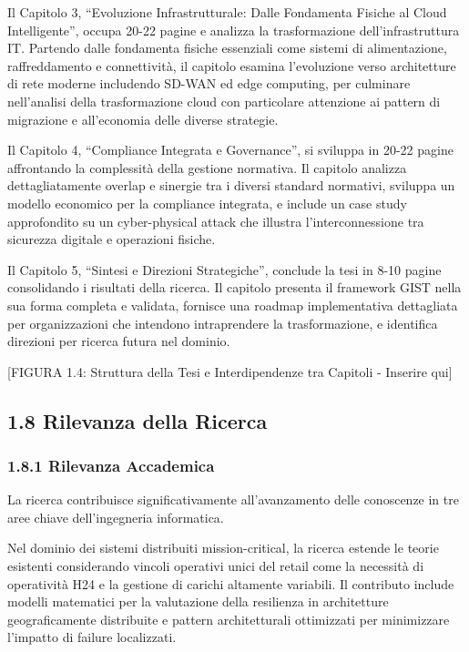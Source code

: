\documentclass{report}
\begin{document}
Il Capitolo 3, ``Evoluzione Infrastrutturale: Dalle Fondamenta Fisiche
al Cloud Intelligente'', occupa 20-22 pagine e analizza la
trasformazione dell'infrastruttura IT. Partendo dalle fondamenta fisiche
essenziali come sistemi di alimentazione, raffreddamento e connettività,
il capitolo esamina l'evoluzione verso architetture di rete moderne
includendo SD-WAN ed edge computing, per culminare nell'analisi della
trasformazione cloud con particolare attenzione ai pattern di migrazione
e all'economia delle diverse strategie.

Il Capitolo 4, ``Compliance Integrata e Governance'', si sviluppa in
20-22 pagine affrontando la complessità della gestione normativa. Il
capitolo analizza dettagliatamente overlap e sinergie tra i diversi
standard normativi, sviluppa un modello economico per la compliance
integrata, e include un case study approfondito su un cyber-physical
attack che illustra l'interconnessione tra sicurezza digitale e
operazioni fisiche.

Il Capitolo 5, ``Sintesi e Direzioni Strategiche'', conclude la tesi in
8-10 pagine consolidando i risultati della ricerca. Il capitolo presenta
il framework GIST nella sua forma completa e validata, fornisce una
roadmap implementativa dettagliata per organizzazioni che intendono
intraprendere la trasformazione, e identifica direzioni per ricerca
futura nel dominio.

{[}FIGURA 1.4: Struttura della Tesi e Interdipendenze tra Capitoli -
Inserire qui{]}

\subsection{\texorpdfstring{\textbf{1.8 Rilevanza della
Ricerca}}{1.8 Rilevanza della Ricerca}}\label{rilevanza-della-ricerca}

\subsubsection{\texorpdfstring{\textbf{1.8.1 Rilevanza
Accademica}}{1.8.1 Rilevanza Accademica}}\label{rilevanza-accademica}

La ricerca contribuisce significativamente all'avanzamento delle
conoscenze in tre aree chiave dell'ingegneria informatica.

Nel dominio dei sistemi distribuiti mission-critical, la ricerca estende
le teorie esistenti considerando vincoli operativi unici del retail come
la necessità di operatività H24 e la gestione di carichi altamente
variabili. Il contributo include modelli matematici per la valutazione
della resilienza in architetture geograficamente distribuite e pattern
architetturali ottimizzati per minimizzare l'impatto di failure
localizzati.
\end{document}
